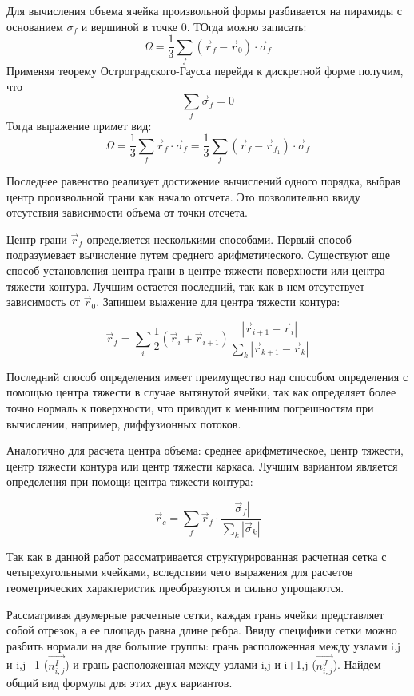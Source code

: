 Для вычисления объема ячейка произвольной формы разбивается на пирамиды с основанием $\sigma_f$ и вершиной в точке 0. ТОгда можно записать:
$$\Omega = \frac{1}{3}\sum_f(\vec{r}_f-\vec{r}_0)\cdot\vec{\sigma}_f$$
Применяя теорему Остроградского-Гаусса перейдя к дискретной форме получим, что 
$$\sum_f\vec{\sigma}_f = 0$$
Тогда выражение примет вид:
\begin{equation}
    \Omega = \frac{1}{3}\sum_f \vec{r}_f\cdot\vec{\sigma}_f = \frac{1}{3}\sum_f (\vec{r}_f - \vec{r}_{f_1})\cdot\vec{\sigma}_f
\end{equation}

Последнее равенство реализует достижение вычислений одного порядка, выбрав центр произвольной грани как начало отсчета. Это позволительно ввиду отсутствия зависимости объема от точки отсчета.

Центр грани $\vec{r}_f$ определяется несколькими способами. Первый способ подразумевает вычисление путем среднего арифметического. Существуют еще способ установления центра грани в центре тяжести поверхности или центра тяжести контура. Лучшим остается последний, так как в нем отсутствует зависимость от $\vec{r}_0$. Запишем выажение для центра тяжести контура:

\begin{equation}
    \vec{r}_f = \sum_i \frac{1}{2}(\vec{r}_i+\vec{r}_{i+1})\frac{|\vec{r}_{i+1}-\vec{r}_i|}{\sum_k|\vec{r}_{k+1}-\vec{r}_k|}
\end{equation}


Последний способ определения имеет преимущество над способом
определения с помощью центра тяжести в случае вытянутой ячейки, так
как определяет более точно нормаль к поверхности, что приводит к
меньшим погрешностям при вычислении, например, диффузионных
потоков.

Аналогично для расчета центра объема: среднее арифметическое, центр тяжести, центр тяжести контура или центр тяжести каркаса. Лучшим вариантом является определения при помощи центра тяжести контура:

\begin{equation}
    \vec{r}_c = \sum_f \vec{r}_f\cdot\frac{|\vec{\sigma}_f|}{\sum_k|\vec{\sigma}_k|}
\end{equation}


Так как в данной работ рассматривается структурированная расчетная сетка с четырехугольными ячейками, вследствии чего выражения для расчетов геометрических характеристик преобразуются и сильно упрощаются.

Рассматривая двумерные расчетные сетки, каждая грань ячейки представляет собой
отрезок, а ее площадь равна длине ребра. Ввиду специфики сетки можно разбить нормали на две большие группы: грань расположенная между узлами i,j и i,j+1 ($\vec{n_{i,j}^I}$) и грань расположенная между узлами i,j и i+1,j ($\vec{n_{i,j}^J}$). Найдем общий вид формулы для этих двух вариантов. 

